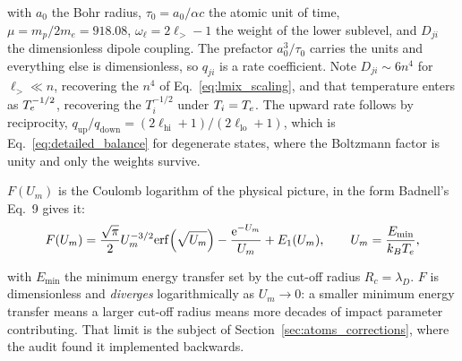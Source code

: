 \noindent with $a_0$ the Bohr radius, $\tau_0 = a_0/\alpha c$ the atomic unit of
time, $\mu = m_p/2m_e = 918.08$, $\omega_\ell = 2\ell_>-1$ the weight of
the lower sublevel, and $D_{ji}$ the dimensionless dipole coupling. The
prefactor $a_0^{3}/\tau_0$ carries the units and everything else is
dimensionless, so $q_{ji}$ is a rate coefficient. Note $D_{ji} \sim 6n^{4}$ for
$\ell_> \ll n$, recovering the $n^{4}$ of Eq.~\eqref{eq:lmix_scaling}, and that
temperature enters as $T_e^{-1/2}$, recovering the $T_i^{-1/2}$ under
$T_i = T_e$. The upward rate follows by reciprocity,
$q_{\mathrm{up}}/q_{\mathrm{down}} =
(2\ell_{\mathrm{hi}}+1)/(2\ell_{\mathrm{lo}}+1)$, which is
Eq.~\eqref{eq:detailed_balance} for degenerate states, where the Boltzmann factor
is unity and only the weights survive.

$F(U_m)$ is the Coulomb logarithm of the physical picture, in the form Badnell's
Eq.~9 gives it:
\begin{equation}
  F(U_m) = \frac{\sqrt{\pi}}{2}U_m^{-3/2}\mathrm{erf}\!\left(\sqrt{U_m}\right)
           - \frac{\mathrm{e}^{-U_m}}{U_m} + E_1(U_m),
  \qquad
  U_m = \frac{E_{\min}}{k_BT_e},
  \label{eq:F_Um}
\end{equation}

\noindent with $E_{\min}$ the minimum energy transfer set by the cut-off radius
$R_c = \lambda_D$. $F$ is dimensionless and \emph{diverges} logarithmically as
$U_m \to 0$: a smaller minimum energy transfer means a larger cut-off radius
means more decades of impact parameter contributing. That limit is the
subject of Section~\ref{sec:atoms_corrections}, where the audit found it
implemented backwards.

